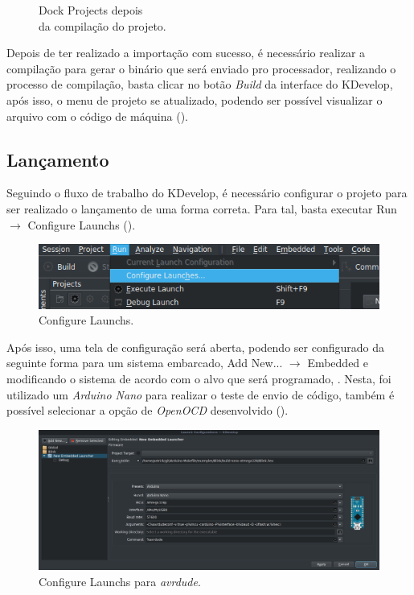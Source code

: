 \begin{figure}[!htb]
\begin{minipage}[t]{0.5\textwidth}
  \caption[Projects depois da compilação]{Dock Projects depois\\ da compilação do projeto.}
  \label{fig:projects2}
  \end{minipage}
\end{figure}

Depois de ter realizado a importação com sucesso, é necessário realizar a compilação para gerar o binário que será enviado pro processador, realizando o processo de compilação, basta clicar no botão \textit{Build} da interface do KDevelop, após isso, o menu de projeto se atualizado, podendo ser possível visualizar o arquivo com o código de máquina ().

\subsection{Lançamento}

Seguindo o fluxo de trabalho do KDevelop, é necessário configurar o projeto para ser realizado o lançamento de uma forma correta. Para tal, basta executar Run $\rightarrow$ Configure Launchs ().

\begin{figure}[!htb]
  \centering
  \includegraphics[width=1\textwidth]{figuras/run.png}
  \caption[Configure Launchs]{Configure Launchs.}
  \label{fig:run}
\end{figure}

Após isso, uma tela de configuração será aberta, podendo ser configurado da seguinte forma para um sistema embarcado, Add New... $\rightarrow$ Embedded e modificando o sistema de acordo com o alvo que será programado, . Nesta, foi utilizado um \textit{Arduino Nano} para realizar o teste de envio de código, também é possível selecionar a opção de \textit{OpenOCD} desenvolvido ().

\begin{figure}[!htb]
  \centering
  \includegraphics[width=1\textwidth]{figuras/run2.png}
  \caption[\textit{Configure Launchs} para \textit{avrdude}]{Configure Launchs para \textit{avrdude}.}
  \label{fig:run2}
\end{figure}

